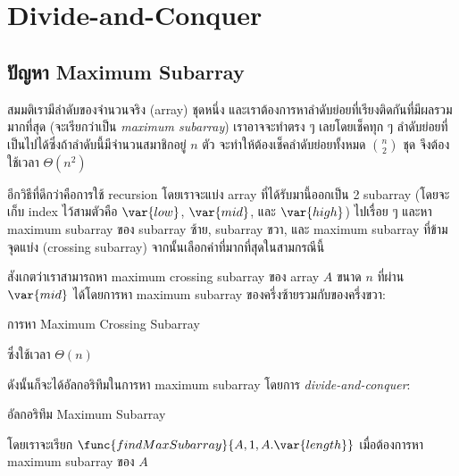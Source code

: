 \chapter{Divide-and-Conquer}

\section{ปัญหา Maximum Subarray}

สมมติเรามีลำดับของจำนวนจริง (array) ชุดหนึ่ง และเราต้องการหาลำดับย่อยที่เรียงติดกันที่มีผลรวมมากที่สุด (จะเรียกว่าเป็น \emph{maximum subarray}) เราอาจจะทำตรง ๆ เลยโดยเช็คทุก ๆ ลำดับย่อยที่เป็นไปได้ซึ่งถ้าลำดับนี้มีจำนวนสมาชิกอยู่ $n$ ตัว จะทำให้ต้องเช็คลำดับย่อยทั้งหมด $\binom{n}{2}$ ชุด จึงต้องใช้เวลา $\Theta(n^2)$

อีกวิธีที่ดีกว่าคือการใช้ recursion โดยเราจะแบ่ง array ที่ได้รับมานี้ออกเป็น 2 subarray (โดยจะเก็บ index ไว้สามตัวคือ $\var{low}$, $\var{mid}$, และ $\var{high}$) ไปเรื่อย ๆ และหา maximum subarray ของ subarray ซ้าย, subarray ขวา, และ maximum subarray ที่ข้ามจุดแบ่ง (crossing subarray) จากนั้นเลือกค่าที่มากที่สุดในสามกรณีนี้

สังเกตว่าเราสามารถหา maximum crossing subarray ของ array $A$ ขนาด $n$ ที่ผ่าน $\var{mid}$ ได้โดยการหา maximum subarray ของครึ่งซ้ายรวมกับของครึ่งขวา:
\begin{codebox}{การหา Maximum Crossing Subarray}

\end{codebox}
ซึ่งใช้เวลา $\Theta(n)$

ดังนั้นก็จะได้อัลกอริทึมในการหา maximum subarray โดยการ \emph{divide-and-conquer}:
\begin{codebox}{อัลกอริทึม Maximum Subarray}
\end{codebox}
โดยเราจะเรียก $\func{findMaxSubarray}{A, 1, A.\var{length}}$ เมื่อต้องการหา maximum subarray ของ $A$ 

